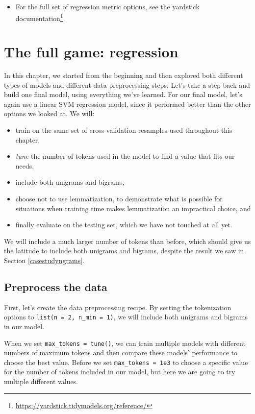 \documentclass[
]{krantz}
\DeclareRobustCommand{\href}[2]{#2\footnote{\url{#1}}}
\renewcommand{\href}[2]{#2\footnote{\url{#1}}}
\newenvironment{rmdblock}[1]
  {\begin{shaded*}
  \begin{itemize}[left = -1cm, labelsep = 1cm]
  \renewcommand{\labelitemi}{
    \raisebox{-.7\height}[0pt][0pt]{
      {\setkeys{Gin}{width=3em,keepaspectratio}\texttt{[image: images/\#1]}}
    }
  }
 
  \item
  }
  {
  \end{itemize}
  \end{shaded*}
  }
\newenvironment{rmdnote}
  {\begin{rmdblock}{note}}
  {\end{rmdblock}}
\begin{document}
\begin{rmdnote}
For the full set of regression metric options, see the
\href{https://yardstick.tidymodels.org/reference/}{yardstick
documentation}.
\end{rmdnote}

\hypertarget{mlregressionfull}{%
\section{The full game: regression}\label{mlregressionfull}}

In this chapter, we started from the beginning and then explored both different types of models and different data preprocessing steps. Let's take a step back and build one final model, using everything we've learned. For our final model, let's again use a linear SVM regression model, since it performed better than the other options we looked at. We will:

\begin{itemize}
\item
  train on the same set of cross-validation resamples used throughout this chapter,
\item
  \emph{tune} the number of tokens used in the model to find a value that fits our needs,
\item
  include both unigrams and bigrams,
\item
  choose not to use lemmatization, to demonstrate what is possible for situations when training time makes lemmatization an impractical choice, and
\item
  finally evaluate on the testing set, which we have not touched at all yet.
\end{itemize}

We will include a much larger number of tokens than before, which should give us the latitude to include both unigrams and bigrams, despite the result we saw in Section \ref{casestudyngrams}.

\hypertarget{preprocess-the-data}{%
\subsection{Preprocess the data}\label{preprocess-the-data}}

First, let's create the data preprocessing recipe. By setting the tokenization options to \texttt{list(n\ =\ 2,\ n\_min\ =\ 1)}, we will include both unigrams and bigrams in our model.

When we set \texttt{max\_tokens\ =\ tune()}, we can train multiple models with different numbers of maximum tokens and then compare these models' performance to choose the best value. Before we set \texttt{max\_tokens\ =\ 1e3} to choose a specific value for the number of tokens included in our model, but here we are going to try multiple different values.
\end{document}
